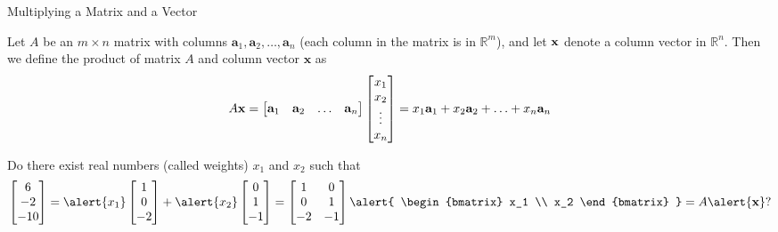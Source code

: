 \documentclass[xcolor=dvipsnames,aspectratio=169,t]{beamer}
\begin{document}
\begin{frame}{Multiplying a Matrix and a Vector}

{\small
  \bbox
  Let $A$ be an $m \times n$ matrix with columns $\mathbf{a}_1, \mathbf{a}_2, \ldots , \mathbf{a}_n$ (each column in the matrix is in $\mathbb{R}^m$), and let $\mathbf{x}$ denote a column vector in $\mathbb{R}^n$. Then we define the product of matrix $A$ and column vector $\mathbf{x}$ as
  \[ A\mathbf{x} = \begin{bmatrix} \mathbf{a}_1 & \mathbf{a}_2 & \ldots & \mathbf{a}_n \end{bmatrix} \begin{bmatrix} x_1 \\ x_2 \\ \vdots \\ x_n \end{bmatrix}
   = x_1  \mathbf{a}_1 + x_2  \mathbf{a}_2  + \ldots + x_n  \mathbf{a}_n \]
   \ebox
}

{\small
   \begin{example}
    Do there exist real numbers (called \alert{weights}) \alert{$x_1$} and \alert{$x_2$} such that
    \[ \bbm 6 \\ -2 \\ -10 \ebm = \alert{x_1} \bbm 1 \\ 0 \\ -2  \ebm + \alert{x_2} \bbm 0 \\ 1 \\ -1  \ebm  = \begin{bmatrix} 1 & 0 \\ 0 & 1 \\ -2 & -1 \end{bmatrix} \alert{ \begin{bmatrix} x_1 \\ x_2 \end{bmatrix} } = A \alert{\mbf{x}} \mbox{?}\]
\end{example} }
   
  \end{frame}
\end{document}
